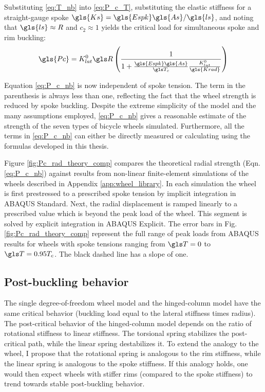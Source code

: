 \documentclass[\rootdir/thesis.tex]{subfiles}
\begin{document}
Substituting \eqref{eq:T_nb} into \eqref{eq:P_c_T}, substituting the elastic stiffness for a straight-gauge spoke $\gls{Ks}=\gls{Espk}\gls{As}/\gls{ls}$, and noting that $\gls{ls} \approx R$ and $c_2\approx 1$ yields the critical load for simultaneous spoke and rim buckling:
\begin{equation}
\label{eq:P_c_nb}
\gls{Pc} = K_{lat}^0 \R \left(\frac{1}{1 + \frac{\gls{Espk}\gls{As}}
						{\T_c}\frac{K_{lat}^0}{\gls{Krad}}}\right)
\end{equation}

Equation \eqref{eq:P_c_nb} is now independent of spoke tension. The term in the parenthesis is always less than one, reflecting the fact that the wheel strength is reduced by spoke buckling. Despite the extreme simplicity of the model and the many assumptions employed, \eqref{eq:P_c_nb} gives a reasonable estimate of the strength of the seven types of bicycle wheels simulated. Furthermore, all the terms in \eqref{eq:P_c_nb} can either be directly measured or calculating using the formulas developed in this thesis.

Figure \ref{fig:Pc_rad_theory_comp} compares the theoretical radial strength (Eqn. \eqref{eq:P_c_nb}) against results from non-linear finite-element simulations of the wheels described in Appendix \ref{app:wheel_library}. In each simulation the wheel is first prestressed to a prescribed spoke tension by implicit integration in ABAQUS Standard. Next, the radial displacement is ramped linearly to a prescribed value which is beyond the peak load of the wheel. This segment is solved by explicit integration in ABAQUS Explicit. The error bars in Fig. \ref{fig:Pc_rad_theory_comp} represent the full range of peak loads from ABAQUS results for wheels with spoke tensions ranging from $\T=0$ to $\T=0.95T_c$. The black dashed line has a slope of one.

\subsection{Post-buckling behavior}

The single degree-of-freedom wheel model and the hinged-column model have the same critical behavior (buckling load equal to the lateral stiffness times radius). The post-critical behavior of the hinged-column model depends on the ratio of rotational stiffness to linear stiffness. The torsional spring stabilizes the post-critical path, while the linear spring destabilizes it. To extend the analogy to the wheel, I propose that the rotational spring is analogous to the rim stiffness, while the linear spring is analogous to the spoke stiffness. If this analogy holds, one would then expect wheels with stiffer rims (compared to the spoke stiffness) to trend towards stable post-buckling behavior.
\end{document}
